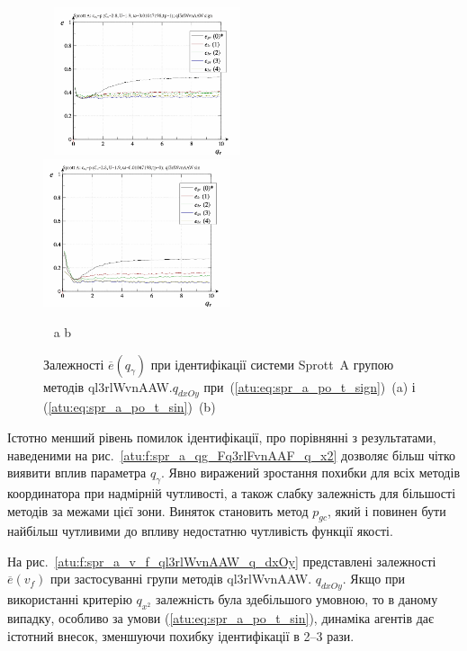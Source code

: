 \begin{figure}[htb!]
\begin{center}
  ~ \hfill
    \includegraphics[width=0.49\textwidth]{p/cha/spr_a/ql3rlWvnAAW_dxOy/sprott_a_id2-p_q_gamma_sign.png}
    \hfill
    \includegraphics[width=0.49\textwidth]{p/cha/spr_a/ql3rlWvnAAW_dxOy/sprott_a_id2-p_q_gamma_sin.png}
  \hfill ~
\end{center}
  \vspace{-1.0ex}
  \begin{center}
    ~ \hfill a \hfill\hfill b \hfill ~
  \end{center}
  \caption{Залежності $\overline{e} (q_\gamma)$ при ідентифікації системи Sprott~A групою методів ql3rlWvnAAW.$q_{dxOy}$ при~(\ref{atu:eq:spr_a_po_t_sign})~(a) і (\ref{atu:eq:spr_a_po_t_sin})~(b)}
  \label{atu:f:spr_a_ql3rlWvnAAW_q_dxOy}
\end{figure}

Істотно менший рівень помилок ідентифікації, про порівнянні з
результатами, наведеними на рис.~\ref{atu:f:spr_a_qg_Fq3rlFvnAAF_q_x2} дозволяє
більш чітко виявити вплив параметра
$q_\gamma$. Явно виражений зростання похибки для всіх методів
координатора при надмірній чутливості, а також слабку
залежність для більшості методів за межами цієї зони. Виняток
становить метод
$p_{gc}$, який і повинен бути найбільш чутливими до впливу
недостатню чутливість функції якості.

На рис.~\ref{atu:f:spr_a_v_f_ql3rlWvnAAW_q_dxOy} представлені залежності
$\overline{e}(v_f)$ при застосуванні групи методів ql3rlWvnAAW.
$q_{dxOy}$. Якщо при використанні критерію
$q_{x^2}$ залежність була здебільшого умовною, то в даному випадку,
особливо за умови (\ref{atu:eq:spr_a_po_t_sin}), динаміка агентів дає істотний
внесок, зменшуючи похибку ідентифікації в 2--3 рази.


